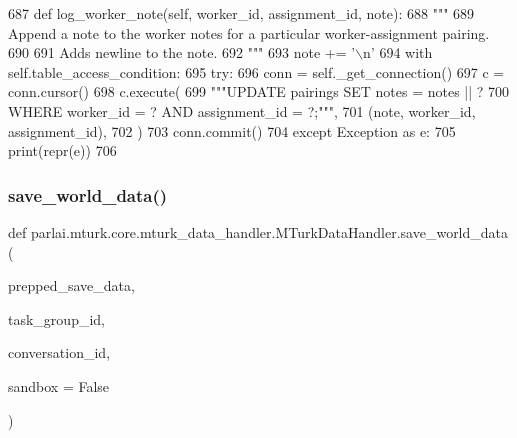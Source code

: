 \begin{DoxyCode}
687     \textcolor{keyword}{def }log\_worker\_note(self, worker\_id, assignment\_id, note):
688         \textcolor{stringliteral}{"""}
689 \textcolor{stringliteral}{        Append a note to the worker notes for a particular worker-assignment pairing.}
690 \textcolor{stringliteral}{}
691 \textcolor{stringliteral}{        Adds newline to the note.}
692 \textcolor{stringliteral}{        """}
693         note += \textcolor{stringliteral}{'\(\backslash\)n'}
694         with self.table\_access\_condition:
695             \textcolor{keywordflow}{try}:
696                 conn = self.\_get\_connection()
697                 c = conn.cursor()
698                 c.execute(
699                     \textcolor{stringliteral}{"""UPDATE pairings SET notes = notes || ?}
700 \textcolor{stringliteral}{                             WHERE worker\_id = ? AND assignment\_id = ?;"""},
701                     (note, worker\_id, assignment\_id),
702                 )
703                 conn.commit()
704             \textcolor{keywordflow}{except} Exception \textcolor{keyword}{as} e:
705                 print(repr(e))
706 
\end{DoxyCode}
\mbox{\label{classparlai_1_1mturk_1_1core_1_1mturk__data__handler_1_1MTurkDataHandler_a500ef3c8e0c9b94d7759436da43a1a62}} 
\subsubsection{\texorpdfstring{save\+\_\+world\+\_\+data()}{save\_world\_data()}}
{\footnotesize\ttfamily def parlai.\+mturk.\+core.\+mturk\+\_\+data\+\_\+handler.\+M\+Turk\+Data\+Handler.\+save\+\_\+world\+\_\+data (\begin{DoxyParamCaption}\item[{}]{prepped\+\_\+save\+\_\+data,  }\item[{}]{task\+\_\+group\+\_\+id,  }\item[{}]{conversation\+\_\+id,  }\item[{}]{sandbox = {\ttfamily False} }\end{DoxyParamCaption})\hspace{0.3cm}{\ttfamily [static]}}



